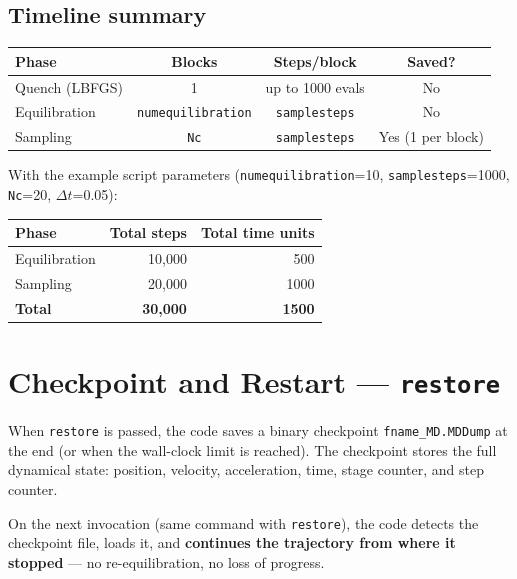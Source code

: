 \documentclass[12pt,a4paper]{article}
\begin{document}
\subsection{Timeline summary}

\begin{center}
\renewcommand{\arraystretch}{1.4}
\begin{tabular}{lccc}
\toprule
Phase & Blocks & Steps/block & Saved? \\
\midrule
Quench (LBFGS) & 1 & up to 1000 evals & No \\
Equilibration & \texttt{numequilibration} & \texttt{samplesteps} & No \\
Sampling & \texttt{Nc} & \texttt{samplesteps} & Yes (1 per block) \\
\bottomrule
\end{tabular}
\end{center}

With the example script parameters (\texttt{numequilibration}=10,
\texttt{samplesteps}=1000, \texttt{Nc}=20, $\Delta t$=0.05):

\begin{center}
\renewcommand{\arraystretch}{1.4}
\begin{tabular}{lrr}
\toprule
Phase & Total steps & Total time units \\
\midrule
Equilibration & 10,000 & 500 \\
Sampling & 20,000 & 1000 \\
\textbf{Total} & \textbf{30,000} & \textbf{1500} \\
\bottomrule
\end{tabular}
\end{center}

\section{Checkpoint and Restart --- \texttt{restore}}

When \texttt{restore} is passed, the code saves a binary checkpoint
\texttt{fname\_MD.MDDump} at the end (or when the wall-clock limit is reached).
The checkpoint stores the full dynamical state:
position, velocity, acceleration, time, stage counter, and step counter.

On the next invocation (same command with \texttt{restore}), the code
detects the checkpoint file, loads it, and \textbf{continues the trajectory
from where it stopped} --- no re-equilibration, no loss of progress.
\end{document}
